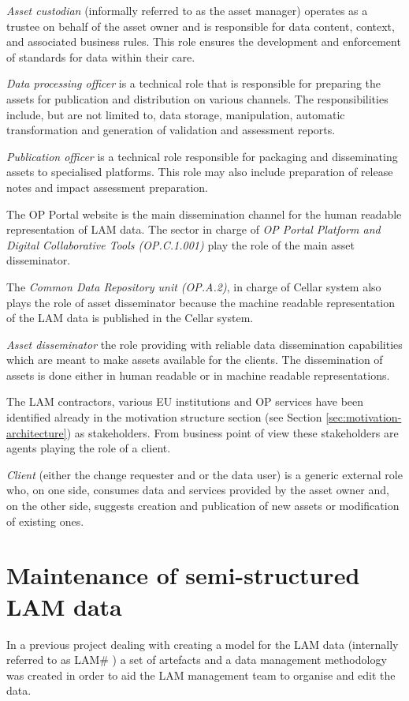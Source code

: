 	\textit{Asset custodian} (informally referred to as the asset manager) operates as a trustee on behalf of the asset owner and is responsible for data content, context, and associated
business rules. This role ensures the development and enforcement of standards for data within their care.
	
	\textit{Data processing officer} is a technical role that is responsible for preparing the assets for publication and distribution on various channels. The responsibilities include, but are not limited to, data storage,
manipulation, automatic transformation and generation of validation and assessment
reports.
	
	\textit{Publication officer} is a technical role responsible for packaging and disseminating
assets to specialised platforms. This role may also include preparation of release notes and impact assessment preparation. 
	
	The OP Portal website is the main dissemination channel for the human readable representation of LAM data. The sector in charge of \textit{OP Portal Platform and Digital Collaborative Tools (OP.C.1.001)} play the role of the main asset disseminator. 
		
	The \textit{Common Data Repository unit (OP.A.2)}, in charge of Cellar system \citep{cdm-francesconi2015ontology} also plays the role of asset disseminator because the machine readable representation of the LAM data is published in the Cellar system.
	
	\textit{Asset disseminator} the role providing with reliable data dissemination capabilities which are meant to make assets available for
the clients. The dissemination of assets is done either in human readable or in machine readable representations.
	
	The LAM contractors, various EU institutions and OP services have been identified already in the motivation structure section (see Section \ref{sec:motivation-architecture}) as stakeholders. From business point of view these stakeholders are agents playing the role of a client.
	
	\textit{Client} (either the change requester and or the data user) is a generic external role who, on one side,
consumes data and services provided by the asset owner and, on the other
side, suggests creation and publication of new assets or modification of existing ones.
	
	\section{Maintenance of semi-structured LAM data}
	\label{sec:maintenance-of-excel}
	In a previous project dealing with creating a model for the LAM data (internally referred to as LAM\# \citep{lam-preliminary-requirements-2019}) a set of artefacts and a data management methodology was created in order to aid the LAM management team to organise and edit the data. 
	
